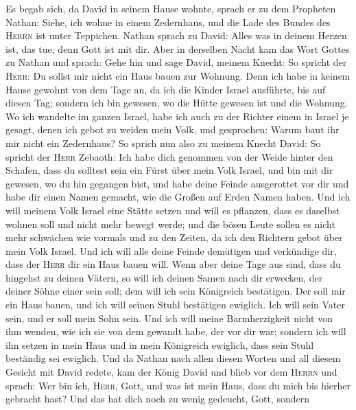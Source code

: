  Es begab sich, da David in seinem Hause wohnte, sprach er
zu dem Propheten Nathan: Siehe, ich wohne in einem Zedernhaus, und die
Lade des Bundes des \textsc{Herrn} ist unter Teppichen. 
Nathan sprach zu David: Alles was in deinem Herzen ist, das tue; denn
Gott ist mit dir.  Aber in derselben Nacht kam das Wort
Gottes zu Nathan und sprach:  Gehe hin und sage David,
meinem Knecht: So spricht der \textsc{Herr}: Du sollst mir nicht ein
Haus bauen zur Wohnung.  Denn ich habe in keinem Hause
gewohnt von dem Tage an, da ich die Kinder Israel ausführte, bis auf
diesen Tag; sondern ich bin gewesen, wo die Hütte gewesen ist und die
Wohnung.  Wo ich wandelte im ganzen Israel, habe ich auch
zu der Richter einem in Israel je gesagt, denen ich gebot zu weiden mein
Volk, und gesprochen: Warum baut ihr mir nicht ein Zedernhaus?
 So sprich nun also zu meinem Knecht David: So spricht der
\textsc{Herr} Zebaoth: Ich habe dich genommen von der Weide hinter den
Schafen, dass du solltest sein ein Fürst über mein Volk Israel,
 und bin mit dir gewesen, wo du hin gegangen bist, und
habe deine Feinde ausgerottet vor dir und habe dir einen Namen gemacht,
wie die Großen auf Erden Namen haben.  Und ich will meinem
Volk Israel eine Stätte setzen und will es pflanzen, dass es daselbst
wohnen soll und nicht mehr bewegt werde; und die bösen Leute sollen es
nicht mehr schwächen wie vormals und zu den Zeiten, da ich den Richtern
gebot über mein Volk Israel.  Und ich will alle deine
Feinde demütigen und verkündige dir, dass der \textsc{Herr} dir ein Haus
bauen will.  Wenn aber deine Tage aus sind, dass du
hingehst zu deinen Vätern, so will ich deinen Samen nach dir erwecken,
der deiner Söhne einer sein soll; dem will ich sein Königreich
bestätigen.  Der soll mir ein Haus bauen, und ich will
seinen Stuhl bestätigen ewiglich.  Ich will sein Vater
sein, und er soll mein Sohn sein. Und ich will meine Barmherzigkeit
nicht von ihm wenden, wie ich sie von dem gewandt habe, der vor dir war;
 sondern ich will ihn setzen in mein Haus und in mein
Königreich ewiglich, dass sein Stuhl beständig sei ewiglich.
 Und da Nathan nach allen diesen Worten und all diesem
Gesicht mit David redete,  kam der König David und blieb
vor dem \textsc{Herrn} und sprach: Wer bin ich, \textsc{Herr}, Gott, und
was ist mein Haus, dass du mich bis hierher gebracht hast?
 Und das hat dich noch zu wenig gedeucht, Gott, sondern
